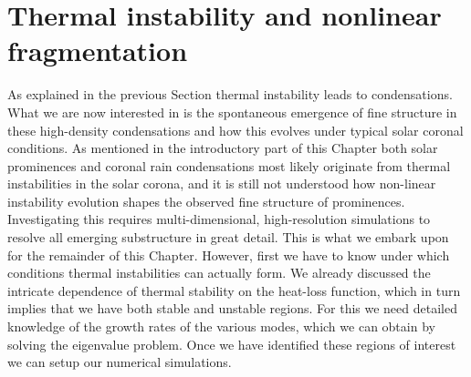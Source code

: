 \section{Thermal instability and nonlinear fragmentation}
As explained in the previous Section thermal instability leads to condensations. What we are now interested in is the spontaneous emergence of fine structure in these high-density condensations and how this evolves under typical solar coronal conditions. As mentioned in the introductory part of this Chapter both solar prominences and coronal rain condensations most likely originate from thermal instabilities in the solar corona, and it is still not understood how non-linear instability evolution shapes the observed fine structure of prominences. Investigating this requires multi-dimensional, high-resolution simulations to resolve all emerging substructure in great detail. This is what we embark upon for the remainder of this Chapter. However, first we have to know under which conditions thermal instabilities can actually form. We already discussed the intricate dependence of thermal stability on the heat-loss function, which in turn implies that we have both stable and unstable regions. For this we need detailed knowledge of the growth rates of the various modes, which we can obtain by solving the eigenvalue problem. Once we have identified these regions of interest we can setup our numerical simulations.


